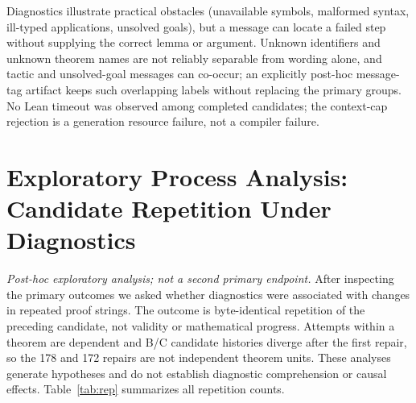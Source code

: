 \documentclass[runningheads,a4paper]{llncs}
\begin{document}
Diagnostics illustrate practical obstacles (unavailable symbols, malformed syntax,
ill-typed applications, unsolved goals), but a message can locate a failed step
without supplying the correct lemma or argument. Unknown identifiers and unknown
theorem names are not reliably separable from wording alone, and tactic and
unsolved-goal messages can co-occur; an explicitly post-hoc message-tag artifact
keeps such overlapping labels without replacing the primary groups. No Lean
timeout was observed among completed candidates; the context-cap rejection is a
generation resource failure, not a compiler failure.

\section{Exploratory Process Analysis: Candidate Repetition Under Diagnostics}
\emph{Post-hoc exploratory analysis; not a second primary endpoint.} After inspecting
the primary outcomes we asked whether diagnostics were associated with changes in
repeated proof strings. The outcome is byte-identical repetition of the preceding
candidate, not validity or mathematical progress. Attempts within a theorem are
dependent and B/C candidate histories diverge after the first repair, so the 178 and
172 repairs are not independent theorem units. These analyses generate hypotheses
and do not establish diagnostic comprehension or causal effects.
Table~\ref{tab:rep} summarizes all repetition counts.

\begin{table}[tbp]
\caption{Byte-identical repetition of the preceding candidate (exploratory).
Held-out test: B vs.\ C by repair stage. Development (15 problems, one seed): B, C
and the mismatched-feedback control C\_placebo. Unknown-name disappearance is shown
for the analysis in the text (B's diagnostics were visible only to the analyst).}
\label{tab:rep}
\centering\footnotesize\setlength{\tabcolsep}{3pt}
\end{table}
\end{document}
